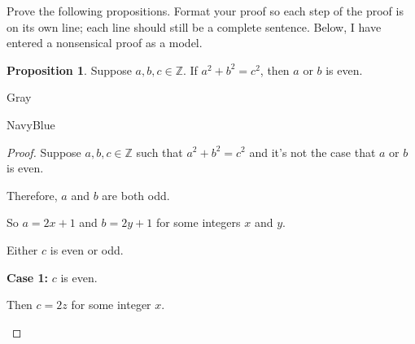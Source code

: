 \documentclass[12pt]{amsart}
\theoremstyle{named}
\newenvironment{prf}
{\medskip\begin{color}{Gray}\begin{framed}\begin{color}{NavyBlue}\begin{proof}[Proof]
\doublespacing}
{\end{proof}\end{color}\end{framed}\end{color}\medskip}
\theoremstyle{definition}
\newtheorem{proposition}{Proposition}
\newcommand{\Z}{\mathbb Z}
\begin{document}
Prove the following propositions. Format your proof so each step of the proof is on its own line; each line should still be a complete sentence. Below, I have entered a nonsensical proof as a model.

\begin{proposition}
	Suppose $a,b,c\in\Z$.
	If $a^2+b^2=c^2$, then $a$ or $b$ is even.
\end{proposition}

\begin{prf}
	\phantom{ }


		

			





			
		

	Suppose $a,b,c \in \mathbb Z$ such that $a^2 + b^2 = c^2$ and it's 
	not the case that $a$ or $b$ is even.

	Therefore, $a$ and $b$ are both odd.

	So $a = 2x + 1$ and $b = 2y + 1$ for some integers $x$ and $y$.

	Either $c$ is even or odd.

	\textbf{Case 1:} $c$ is even.
	\begin{adjustwidth}{2em}{0em} 
		Then $c = 2z$ for some integer $x$.


\end{adjustwidth}
\end{prf}
\end{document}
